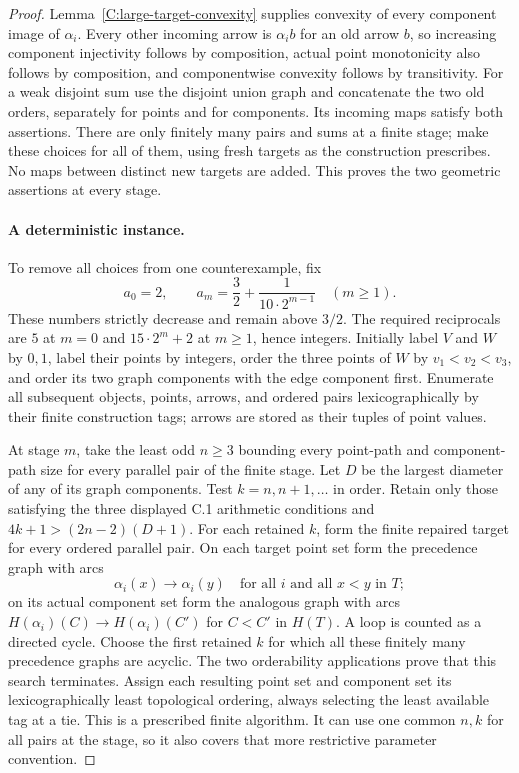 \begin{proof}
Lemma~\ref{C:large-target-convexity} supplies convexity of every
component image of $\alpha_i$. Every other incoming arrow is
$\alpha_i b$ for an old arrow $b$, so increasing component
injectivity follows by composition, actual point monotonicity
also follows by composition, and componentwise convexity follows
by transitivity. For a weak disjoint sum use the disjoint union
graph and concatenate the two old orders, separately for points
and for components. Its
incoming maps satisfy both assertions. There are only finitely
many pairs and sums at a finite stage; make these choices for all
of them, using fresh targets as the construction prescribes.
No maps between distinct new targets are added. This proves the
two geometric assertions at every stage.

\paragraph{A deterministic instance.}
To remove all choices from one counterexample, fix
\[
 a_0=2,\qquad
 a_m=\frac32+\frac{1}{10\cdot2^{m-1}}\quad(m\geq1).
\]
These numbers strictly decrease and remain above $3/2$. The required
reciprocals are $5$ at $m=0$ and $15\cdot2^m+2$ at $m\geq1$, hence
integers. Initially label $V$ and $W$ by $0,1$, label their points by
integers, order the three points of $W$ by $v_1<v_2<v_3$, and order its
two graph components with the edge component first. Enumerate all
subsequent objects, points, arrows, and ordered pairs lexicographically
by their finite construction tags; arrows are stored as their tuples
of point values.

At stage $m$, take the least odd $n\geq3$ bounding every point-path
and component-path size for every parallel pair of the finite stage.
Let $D$ be the largest diameter of any of its graph components.
Test $k=n,n+1,\ldots$ in order. Retain only those satisfying the three
displayed C.1 arithmetic conditions and
$4k+1>(2n-2)(D+1)$. For each retained $k$, form the finite repaired
target for every ordered parallel pair. On each target point set
form the precedence graph with arcs
\[
 \alpha_i(x)\longrightarrow\alpha_i(y)
 \quad\text{for all }i\text{ and all }x<y\text{ in }T;
\]
on its actual component set form the analogous graph with arcs
$H(\alpha_i)(C)\to H(\alpha_i)(C')$ for $C<C'$ in $H(T)$.
A loop is counted as a directed cycle. Choose the first retained
$k$ for which all these finitely many precedence graphs are acyclic.
The two orderability applications prove that this search terminates.
Assign each resulting point set and component set its lexicographically
least topological ordering, always selecting the least available tag
at a tie. This is a prescribed finite algorithm. It can use one common
$n,k$ for all pairs at the stage, so it also covers that more restrictive
parameter convention.


\end{proof}
